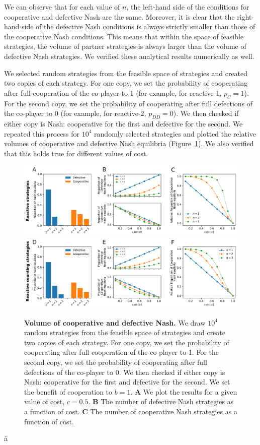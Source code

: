 \documentclass[11pt]{article}
\theoremstyle{plainCl1}
\theoremstyle{plainCl2}
\begin{document}
\noindent
We can observe that for each value of \(n\), the left-hand side of the
conditions for cooperative and defective Nash are the same. Moreover, it is
clear that the right-hand side of the defective Nash conditions is always
strictly smaller than those of the cooperative Nash conditions. This means that
within the space of feasible strategies, the volume of partner strategies is
always larger than the volume of defective Nash strategies. We verified these
analytical results numerically as well.

We selected random strategies from the feasible space of strategies and created
two copies of each strategy. For one copy, we set the probability of cooperating
after full cooperation of the co-player to 1 (for example, for reactive-1, \(p_{C} = 1\)). 
For the second copy, we set the probability of cooperating after
full defections of the co-player to 0 (for example, for reactive-2, \(p_{DD} =
0\)). We then checked if either copy is Nash: cooperative for the first and
defective for the second. We repeated this process for \(10^4\) randomly
selected strategies and plotted the relative volumes of cooperative and
defective Nash equilibria (Figure~\ref{fig:reactive_volume}). We also verified
that this holds true for different values of cost.

\begin{figure}[t]
  \centering
  \includegraphics[width=\textwidth]{../../figures/siFig1.pdf}
  \includegraphics[width=\textwidth]{../../figures/siFig1Counting.pdf}
  \caption{
  \textbf{Volume of cooperative and defective Nash.}
We draw \(10^4\) random
strategies from the feasible space of strategies and create two copies of each
strategy. For one copy, we set the probability of cooperating after full
cooperation of the co-player to 1. For the second copy, we set the probability
of cooperating after full defections of the co-player to 0. We then checked if
either copy is Nash: cooperative for the first and defective for the second. We
set the benefit of cooperation to \(b = 1\). 
{\bf A} We plot the results for a given value of cost, \(c = 0.5\).
{\bf B} The number of defective Nash strategies as a function of cost.
{\bf C} The number of cooperative Nash strategies as a function of cost.
}\label{fig:reactive_volume}
\end{figure}
å
\end{document}
